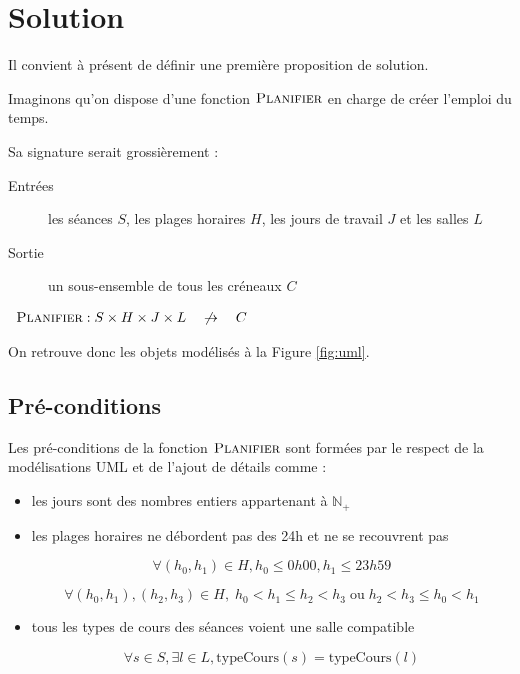 
\section{Solution}

Il convient à présent de définir une première proposition de solution.

Imaginons qu’on dispose d’une fonction $\textsc{Planifier}$ en charge de créer
l’emploi du temps.

Sa signature serait grossièrement :

\begin{description}

\item[Entrées] les séances $S$, les plages horaires $H$, les jours de
travail $J$ et les salles $L$
\item[Sortie] un sous-ensemble de tous les créneaux $C$

\end{description}

\begin{center}

$ \begin{array}{ll}
\textsc{Planifier} : S \times H \times J \times L \quad \not\to \quad C
\end{array}$

\end{center}

On retrouve donc les objets modélisés à la Figure \ref{fig:uml}.

\subsection{Pré-conditions}

Les pré-conditions de la fonction $\textsc{Planifier}$ sont formées par le respect
de la modélisations UML et de l'ajout de détails comme :

\begin{itemize}

    \item les jours sont des nombres entiers appartenant à $\mathbb{N}_{+}$
    \item les plages horaires ne débordent pas des 24h et ne se recouvrent pas

        \[
            \forall(h_0, h_1) \in H, h_0 \leq 0h00, h_1 \leq 23h59
        \]

        \[
            \forall(h_0, h_1),(h_2, h_3) \in H, \;
            h_0 < h_1 \leq h_2 < h_3 \;
            \text{ou} \; h_2 < h_3 \leq h_0 < h_1
        \]

    \item tous les types de cours des séances voient une salle compatible

        \[
            \forall s \in S, \exists l \in L, \text{typeCours}(s) =
            \text{typeCours}(l)
        \]

\end{itemize}

